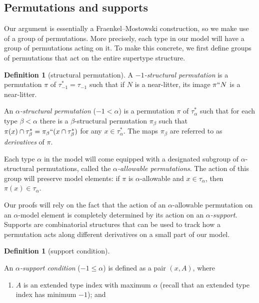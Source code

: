 \documentclass{article}
\newif\ifshowannotations
\newcommand{\annot}[1]{\ifshowannotations\marginpar{#1}\fi}
\theoremstyle{definition}
\newtheorem{definition}[theorem]{Definition}
\theoremstyle{remark}
\begin{document}
{\subsection{Permutations and supports}

Our argument is essentially a Fraenkel--Mostowski construction, so we make use of a group of permutations.
More precisely, each type in our model will have a group of permutations acting on it.
To make this concrete, we first define groups of permutations that act on the entire supertype structure.

\begin{definition}[structural permutation]\label{def:structural_permutation}
A {\em $-1$-structural permutation\/} is a permutation $\pi$ of $\tau_{-1}^* = \tau_{-1}$ such that if $N$ is a near-litter, its image $\pi``N$ is a near-litter.\annot{\scriptsize Added clause here to match Lean definition. Needed for stating the action of a permutation on a support since we do this earlier now.}

An {\em $\alpha$-structural permutation\/} ($-1 < \alpha$) is a permutation $\pi$ of $\tau_\alpha^*$ such that for each type $\beta<\alpha$ there is a $\beta$-structural permutation
$\pi_\beta$ such that $\pi(x) \cap \tau^*_\beta = \pi_\beta``(x \cap \tau^*_\beta)$ for any $x \in \tau^*_\alpha$.
The maps $\pi_\beta$ are referred to as {\em derivatives\/} of $\pi$.
\end{definition}

Each type $\alpha$ in the model will come equipped with a designated subgroup of $\alpha$-structural permutations, called the \emph{$\alpha$-allowable permutations}.
The action of this group will preserve model elements: if $\pi$ is $\alpha$-allowable and $x \in \tau_\alpha$, then $\pi(x) \in \tau_\alpha$.

Our proofs will rely on the fact that the action of an $\alpha$-allowable permutation on an $\alpha$-model element is completely determined by its action on an \emph{$\alpha$-support}.
Supports are combinatorial structures that can be used to track how a permutation acts along different derivatives on a small part of our model.

\begin{definition}[support condition]\label{def:support_condition}

An {\em $\alpha$-support condition\/} ($-1 \leq \alpha$) is defined as a pair $(x,A)$, where
\begin{enumerate}

\item $A$ is an extended type index with maximum $\alpha$  (recall that an extended type index has minimum $-1$); and


\end{enumerate}
\end{definition}}
\end{document}
